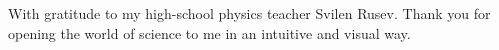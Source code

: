 \thispagestyle{empty}
{}

\vspace*{3cm}

\begin{center}
    With gratitude to my high-school physics teacher Svilen Rusev. Thank you for
    opening the world of science to me in an intuitive and visual way.
\end{center}

\medskip
